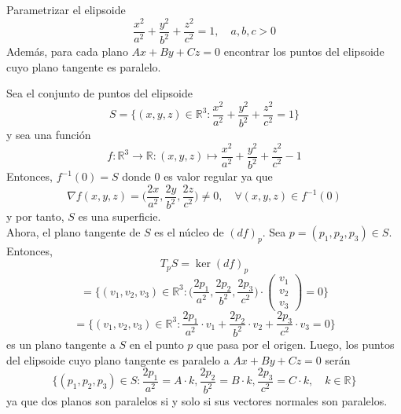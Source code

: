 \begin{ejr}[3]
  Parametrizar el elipsoide
  \[ 
    \frac{x^{2}}{a^{2}} + \frac{y^{2}}{b^{2}} + \frac{z^{2}}{c^{2}} = 1, \quad a, b, c > 0
  \] 
  Además, para cada plano $Ax + By +Cz = 0$ encontrar los puntos del elipsoide cuyo plano tangente es paralelo.
\end{ejr}

\begin{sol}
  Sea el conjunto de puntos del elipsoide
  \[ 
    S = \Bigg \{ (x, y, z) \in \mathbb{R}^{3} : \frac{x^{2}}{a^{2}} + \frac{y^{2}}{b^{2}} + \frac{z^{2}}{c^{2}} = 1 \Bigg \}
  \] 
  y sea una función
  \[ 
    f : \mathbb{R}^{3} \to \mathbb{R} : (x, y, z) \mapsto \frac{x^{2}}{a^{2}} + \frac{y^{2}}{b^{2}} + \frac{z^{2}}{c^{2}} - 1
  \] 
  Entonces, $f^{-1}(0) = S$ donde $0$ es valor regular ya que
  \[
    \nabla f(x, y, z) = \Big ( \frac{2x}{a^{2}}, \frac{2y}{b ^{2}}, \frac{2z}{c^{2}} \Big ) \neq 0, \quad \forall (x, y, z) \in f^{-1}(0)
  \]
  y por tanto, $S$ es una superficie. \\

  Ahora, el plano tangente de $S$ es el núcleo de $(d f)_{p}$. Sea $p =(p_{1}, p_{2}, p_{3}) \in S$. Entonces,
  \[ 
    T_{p}S = \ker (d f)_{p} 
  \] 
  \[ 
    = \Bigg\{ (v_{1}, v_{2}, v_{3}) \in \mathbb{R}^{3} : \Big ( \frac{2p_{1}}{a^{2}}, \frac{2p_{2}}{b ^{2}}, \frac{2p_{3}}{c^{2}} \Big ) \cdot 
      \begin{pmatrix}
       v_{1} \\
       v_{2} \\
       v_{3} 
      \end{pmatrix}
    = 0
  \Bigg\} 
  \] 
  \[ 
    = \Bigg\{ (v_{1}, v_{2}, v_{3}) \in \mathbb{R}^{3} : \frac{2p_{1}}{a^{2}} \cdot v_{1} + \frac{2p_{2}}{b ^{2}} \cdot v_{2} + \frac{2p_{3}}{c^{2}} \cdot v_{3} = 0
    \Bigg \}
  \] 
  es un plano tangente a $S$ en el punto $p$ que pasa por el origen. Luego, los puntos del elipsoide cuyo plano tangente es paralelo a $Ax + By +Cz = 0$ serán 
  \[ 
    \Bigg\{ (p_{1}, p_{2}, p_{3}) \in S : \frac{2p_{1}}{a^{2}} = A \cdot k, \frac{2p_{2}}{b ^{2}} = B \cdot k, \frac{2p_{3}}{c^{2}} = C \cdot k, \quad k \in \mathbb{R} \Bigg\} 
  \] 
  ya que dos planos son paralelos si y solo si sus vectores normales son paralelos.

\end{sol}
